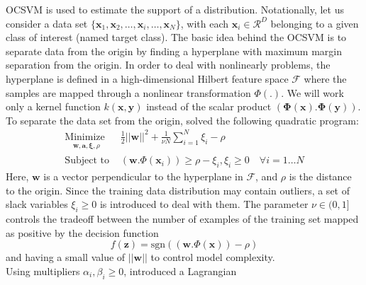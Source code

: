 \documentclass[conference]{IEEEtran}
\begin{document}
OCSVM is used to estimate the support of a distribution.
Notationally, let us consider a data set $\{\mathbf{x}_1,\mathbf{x}_2,\ldots,\mathbf{x}_i, \ldots,\mathbf{x}_N\}$, 
with each $\mathbf{x}_i\in \mathcal{R}^D$ belonging to a given class of interest (named target class). 
The basic idea behind the OCSVM is to separate data from the origin by finding a hyperplane with maximum margin separation from
the origin. In order to deal with nonlinearly problems, the hyperplane is defined in a high-dimensional Hilbert feature space $\mathcal{F}$ where
the samples are mapped through a nonlinear transformation $\Phi(.)$. We will work only a kernel function $k(\mathbf{x},\mathbf{y})$ instead of the scalar 
product $(\boldsymbol{\Phi}(\mathbf{x}).\boldsymbol{\Phi}(\mathbf{y}))$. To separate the data set from the 
origin, \cite{scholkopf2001estimating} solved the following quadratic program:
\begin{subequations}\label{euq:ocsvm}
\begin{align}
\underset{
	\begin{array}{c}
		 \mathbf{w}, \mathbf{a}, \boldsymbol{\xi}, \rho
	\end{array}}{\text{Minimize }} & \frac{1}{2}\left|\left| \mathbf{w}\right|\right|^2 + \frac{1}{\nu N}\sum_{i=1}^N\xi_i -\rho\\
	\label{euq:constraints}
\text{Subject to } &  (\mathbf{w}.\Phi(\mathbf{x}_i))\geq \rho -\xi_i, \xi_i \ge 0 \quad \forall i=1\ldots N
\end{align}
\end{subequations}
Here, $\mathbf{w}$ is a vector perpendicular to the hyperplane in $\mathcal{F}$, and $\rho$ is the 
distance to the origin. Since the training data distribution
may contain outliers, a set of slack variables $\xi_i\geq0$ is introduced to deal with them. The
parameter $\nu \in (0,1]$ controls the tradeoff between the number
of examples of the training set mapped as positive by the
decision function
\begin{equation}
\label{equ:defosvm}
f(\mathbf{z})=\text{sgn}((\mathbf{w}.\Phi(\mathbf{x}))- \rho)
\end{equation}
and having a small value of $\left|\left| \mathbf{w}\right|\right|$ to control model complexity.\\

Using multipliers $\alpha_i,\beta_i\geq0$, \cite{scholkopf2001estimating} introduced a Lagrangian
\end{document}
